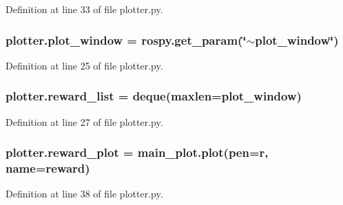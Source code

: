 Definition at line 33 of file plotter.\+py.

\subsubsection[{\texorpdfstring{plot\+\_\+window}{plot_window}}]{\setlength{\rightskip}{0pt plus 5cm}plotter.\+plot\+\_\+window = rospy.\+get\+\_\+param(\char`\"{}$\sim$plot\+\_\+window\char`\"{})}\hypertarget{namespaceplotter_abbb49ab9c0174321374123fd800937f1}{}\label{namespaceplotter_abbb49ab9c0174321374123fd800937f1}


Definition at line 25 of file plotter.\+py.

\subsubsection[{\texorpdfstring{reward\+\_\+list}{reward_list}}]{\setlength{\rightskip}{0pt plus 5cm}plotter.\+reward\+\_\+list = deque(maxlen={\bf plot\+\_\+window})}\hypertarget{namespaceplotter_aa648ebbb57476267f9430be51eeb420c}{}\label{namespaceplotter_aa648ebbb57476267f9430be51eeb420c}


Definition at line 27 of file plotter.\+py.

\subsubsection[{\texorpdfstring{reward\+\_\+plot}{reward_plot}}]{\setlength{\rightskip}{0pt plus 5cm}plotter.\+reward\+\_\+plot = main\+\_\+plot.\+plot(pen=\textquotesingle{}r\textquotesingle{}, name=\textquotesingle{}reward\textquotesingle{})}\hypertarget{namespaceplotter_a40062593c153ab9d59f836890f82dfc7}{}\label{namespaceplotter_a40062593c153ab9d59f836890f82dfc7}


Definition at line 38 of file plotter.\+py.

